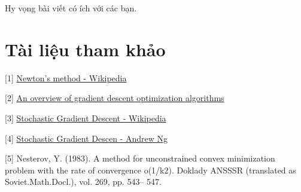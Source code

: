 Hy vọng bài viết có ích với các bạn. 
 
 
\section{Tài liệu tham khảo}
 
[1] \href{https://en.wikipedia.org/wiki/Newton's_method}{Newton's method - Wikipedia} 
 
[2] \href{http://sebastianruder.com/optimizing-gradient-descent/index.html#stochasticgradientdescent}{An overview of gradient descent optimization algorithms} 
 
[3] \href{https://en.wikipedia.org/wiki/Stochastic_gradient_descent}{Stochastic Gradient Descent - Wikipedia} 
 
[4] \href{https://www.youtube.com/watch?v=UfNU3Vhv5CA}{Stochastic Gradient Descen - Andrew Ng}  
 
[5] Nesterov, Y. (1983). A method for unconstrained convex minimization problem with the rate of convergence o(1/k2). Doklady ANSSSR (translated as Soviet.Math.Docl.), vol. 269, pp. 543– 547. 
